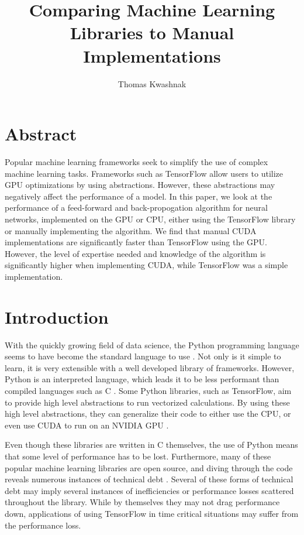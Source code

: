 \documentclass[12pt]{article}
\author{Thomas Kwashnak}
\title{Comparing Machine Learning Libraries to Manual Implementations}
\newcommand{\CC}{C\nolinebreak\hspace{-.05em}\raisebox{.4ex}{\tiny\bf +}\nolinebreak\hspace{-.10em}\raisebox{.4ex}{\tiny\bf +} }
\begin{document}
\maketitle

\newpage

\newpage

\section{Abstract}

Popular machine learning frameworks seek to simplify the use of complex machine learning tasks.
Frameworks such as TensorFlow allow users to utilize GPU optimizations by using abstractions.
However, these abstractions may negatively affect the performance of a model.
In this paper, we look at the performance of a feed-forward and back-propogation algorithm for neural networks, implemented on the GPU or CPU, either using the TensorFlow library or manually implementing the algorithm.
We find that manual CUDA implementations are significantly faster than TensorFlow using the GPU.
However, the level of expertise needed and knowledge of the algorithm is significantly higher when implementing CUDA, while TensorFlow was a simple implementation.


\section{Introduction}

With the quickly growing field of data science, the Python programming language seems to have become the standard language to use \cite{article_python_growing_language}.
Not only is it simple to learn, it is very extensible with a well developed library of frameworks.
However, Python is an interpreted language, which leads it to be less performant than compiled languages such as \CC \cite{article_compiled_interpreted_hybrid_languages}.
Some Python libraries, such as TensorFlow, aim to provide high level abstractions to run vectorized calculations.
By using these high level abstractions, they can generalize their code to either use the CPU, or even use CUDA \cite{lib_cuda} to run on an NVIDIA GPU \cite{lib_tensorflow}.

Even though these libraries are written in \CC themselves, the use of Python means that some level of performance has to be lost.
Furthermore, many of these popular machine learning libraries are open source, and diving through the code reveals numerous instances of technical debt \cite{article_deep_learning_framework_debt}.
Several of these forms of technical debt may imply several instances of inefficiencies or performance losses scattered throughout the library.
While by themselves they may not drag performance down, applications of using TensorFlow in time critical situations may suffer from the performance loss.
\end{document}
